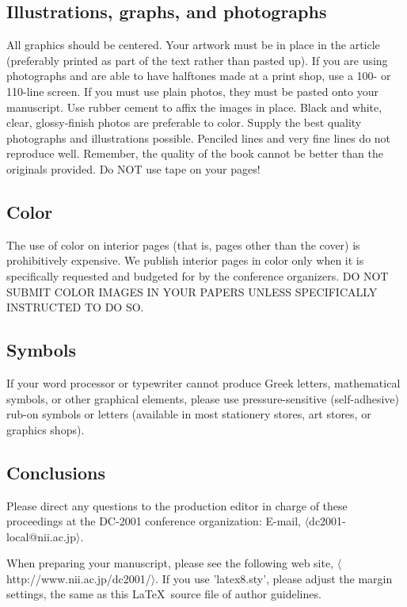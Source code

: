 \subsection{Illustrations, graphs, and photographs}

All graphics should be centered. Your artwork must be in place in the 
article (preferably printed as part of the text rather than pasted up). 
If you are using photographs and are able to have halftones made at a 
print shop, use a 100- or 110-line screen. If you must use plain photos, 
they must be pasted onto your manuscript. Use rubber cement to affix the 
images in place. Black and white, clear, glossy-finish photos are 
preferable to color. Supply the best quality photographs and 
illustrations possible. Penciled lines and very fine lines do not 
reproduce well. Remember, the quality of the book cannot be better than 
the originals provided. Do NOT use tape on your pages!

\subsection{Color}

The use of color on interior pages (that is, pages other 
than the cover) is prohibitively expensive. We publish interior pages in 
color only when it is specifically requested and budgeted for by the
conference organizers. DO NOT SUBMIT COLOR IMAGES IN YOUR 
PAPERS UNLESS SPECIFICALLY INSTRUCTED TO DO SO.

\subsection{Symbols}

If your word processor or typewriter cannot produce Greek letters, 
mathematical symbols, or other graphical elements, please use 
pressure-sensitive (self-adhesive) rub-on symbols or letters (available 
in most stationery stores, art stores, or graphics shops).

\subsection{Conclusions}

Please direct any questions to the production editor in charge of
these proceedings at the DC-2001 conference organization: E-mail,
$\langle$dc2001-local@nii.ac.jp$\rangle$.

When preparing your manuscript, please see the following web site,
$\langle$http://www.nii.ac.jp/dc2001/$\rangle$.  If you use
'latex8.sty', please adjust the margin settings, the same as
this \LaTeX\ source file of author guidelines.

\nocite{ex1,ex2}




